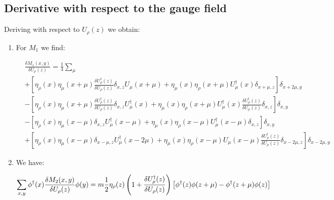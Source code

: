 \documentclass[12pt, a4paper]{article}
\begin{document}
\subsection{Derivative with respect to the gauge field}

Deriving with respect to $U_{\rho}(z)$ we obtain:

\begin{enumerate}
    \item 
For $M_1$ we find:
  
\begin{equation}
\begin{aligned}
  &\frac{\delta M_1(x,y)}{\delta U_{\rho}(z)} = 
  \frac{1}{4} \sum_{\mu} 
  \\
  &+ 
  \left[ 
  \eta_{\rho}(x) \eta_{\mu}(x+\mu)
  \frac{\delta U^{\dagger}_{\rho}(z)}{\delta U_{\rho}(z)} 
  \delta_{x,z} U_\mu(x+\mu)
  + 
  \eta_{\mu}(x) \eta_{\rho}(x+\mu)
  U^{\dagger}_{\mu}(x)
  \delta_{x+\mu, z} 
  \right]
  \delta_{x+2\mu, y} 
  \\
  &-\left[
  \eta_{\rho}(x) \eta_{\mu}(x+\mu) 
  \frac{\delta U^{\dagger}_{\rho}(z)}{\delta U_{\rho}(z)} 
  \delta_{x,z} U^{\dagger}_\mu(x)
  + 
  \eta_{\mu}(x) \eta_{\rho}(x+\mu) 
  U^{\dagger}_\mu(x)
  \frac{\delta U^{\dagger}_{\rho}(z)}{\delta U_{\rho}(z)} 
  \delta_{x,z}
  \right]
  \delta_{x,y}
  \\
  &-\left[
  \eta_{\rho}(x) \eta_{\mu}(x-\mu) 
  \delta_{x,z} U^{\dagger}_\mu(x-\mu)
  +
  \eta_{\mu}(x) \eta_{\rho}(x-\mu)
  U^{\dagger}_\mu(x-\mu)
  \delta_{x,z}
  \right]
  \delta_{x,y}
  \\
  &+\left[ 
  \eta_{\rho}(x) \eta_{\mu}(x-\mu)  
  \delta_{x-\mu,z} U^{\dagger}_\mu(x-2\mu)
  +\eta_{\mu}(x) \eta_{\rho}(x-\mu) 
  U_{\mu}(x-\mu)
  \frac{\delta U^{\dagger}_{\rho}(z)}{\delta U_{\rho}(z)}
  \delta_{x-2\mu, z} 
  \right]
  \delta_{x-2\mu, y}
\end{aligned}
\end{equation}

\item
We have:
  
\begin{equation}
    \sum_{x, y} 
    \phi^{\dagger}(x) 
    \frac{\delta M_2(x, y)}{\delta U_{\rho}(z)} 
    \phi(y)
    \\ =
    m \frac{1}{2} \eta_\rho(z) 
    \left(
    1 + \frac{\delta U^{\dagger}_{\rho}(z)}{\delta U_{\rho}(z)}
    \right)
    \left[
    \phi^{\dagger}(z) \phi(z+\mu)
    -\phi^{\dagger}(z+\mu) \phi(z)
    \right]
\end{equation}



\end{enumerate}
\end{document}
